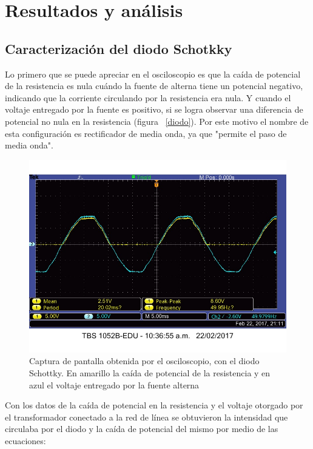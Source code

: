 \documentclass[twoside,twocolumn,a4paper]{article}
\begin{document}

\section{Resultados y an\'alisis}

\subsection{Caracterizaci\'on del diodo Schotkky}
Lo primero que se puede apreciar en el osciloscopio es que la ca\'ida de potencial de la resistencia es nula cu\'ando la fuente de alterna tiene un potencial negativo, indicando que la corriente circulando por la resistencia era nula. Y cuando el voltaje entregado por la fuente es positivo, si se logra observar una diferencia de potencial no nula en la resistencia (figura ~\ref{diodo}). Por este motivo el nombre de esta configuraci\'on es rectificador de media onda, ya que "permite el paso de media onda". 

\begin{figure}[h]
\includegraphics[width=\linewidth]{Diodo.jpg}
\captionsetup{justification=centering}
\caption{Captura de pantalla obtenida por el osciloscopio, con el diodo Schottky. En amarillo la ca\'ida de potencial de la resistencia y en azul el voltaje entregado por la fuente alterna}
\label{fig:diodo}
\end{figure}

Con los datos de la ca\'ida de potencial en la resistencia y el voltaje otorgado por el transformador conectado a la red de l\'inea se obtuvieron la intensidad que circulaba por el diodo y la ca\'ida de potencial del mismo por medio de las ecuaciones:
\end{document}
